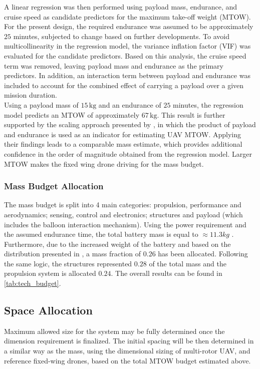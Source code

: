 A linear regression was then performed using payload mass, endurance, and cruise speed as candidate predictors for the maximum take-off weight (MTOW). For the present design, the required endurance was assumed to be approximately $25$ minutes, subjected to change based on further developments. To avoid multicollinearity in the regression model, the variance inflation factor (VIF) was evaluated for the candidate predictors. Based on this analysis, the cruise speed term was removed, leaving payload mass and endurance as the primary predictors. In addition, an interaction term between payload and endurance was included to account for the combined effect of carrying a payload over a given mission duration.\\

Using a payload mass of $15\,\mathrm{kg}$ and an endurance of $25$ minutes, the regression model predicts an MTOW of approximately $67\,\mathrm{kg}$. This result is further supported by the scaling approach presented by \cite{Diogo2024AScaling}, in which the product of payload and endurance is used as an indicator for estimating UAV MTOW. Applying their findings leads to a comparable mass estimate, which provides additional confidence in the order of magnitude obtained from the regression model. Larger MTOW makes the fixed wing drone driving for the mass budget.
\vspace{-10pt}
\subsubsection{Mass Budget Allocation}
The mass budget is split into 4 main categories: propulsion, performance and aerodynamics; sensing, control and electronics; structures and payload (which includes the balloon interaction mechanism). Using the power requirement and the assumed endurance time, the total battery mass is equal to $\approx 11.3kg$ \cite{Ardelean2023UnmannedScaling} \cite{Gatti2017CompleteMultirotor}. Furthermore, due to the increased weight of the battery and based on the distribution presented in \cite{Beard2005AutonomousUAVs}, a mass fraction of $0.26$ has been allocated. Following the same logic, the structures represented $0.28$ of the total mass and the propulsion system is allocated $0.24$. The overall results can be found in \autoref{tab:tech_budget}.
\vspace{-10pt}
\subsection{Space Allocation}
Maximum allowed size for the system may be fully determined once the dimension requirement is finalized. The initial spacing will be then determined in a similar way as the mass, using the dimensional sizing of multi-rotor UAV, and reference fixed-wing drones, based on the total MTOW budget estimated above.
\vspace{-10pt}


